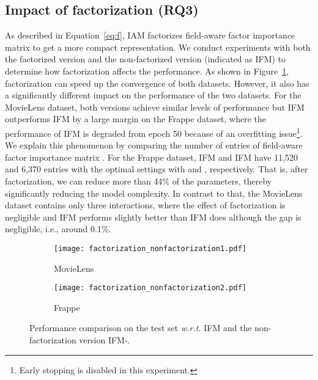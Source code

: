 \documentclass[letterpaper]{article} \usepackage{aaai19}  \usepackage{times}  \usepackage{helvet}  \usepackage{courier}  \usepackage{url}  \usepackage{graphicx}  \frenchspacing  \setlength{\pdfpagewidth}{8.5in}  \setlength{\pdfpageheight}{11in}  \usepackage{mathtools}
\begin{document}
\subsection{Impact of factorization (\textbf{RQ3})}
As described in Equation~\ref{eq:f}, IAM factorizes field-aware factor importance matrix  to get a more compact representation. We conduct experiments with both the factorized version and the non-factorized version (indicated as IFM)
to determine how factorization affects the performance. As shown in Figure~\ref{fig:factorization_nonfactorization}, factorization can speed up the convergence of both datasets. However, it also has a significantly different impact on the performance of the two datasets. For the MovieLens dataset, both versions achieve similar levels of performance but IFM outperforms IFM by a large margin on the Frappe dataset, where the performance of IFM is degraded from epoch 50 because of an overfitting issue\footnote{Early stopping is disabled in this experiment.}. We explain this phenomenon by comparing the number of entries of field-aware factor importance matrix . For the Frappe dataset, IFM and IFM have 11,520 and 6,370 entries with the optimal settings with  and , respectively. That is, after factorization, we can reduce more than 44\% of the parameters, thereby significantly reducing the model complexity. In contrast to that, the MovieLens dataset contains only three interactions, where the effect of factorization is negligible and IFM performs slightly better than IFM does although the gap is negligible, i.e., around 0.1\%.



\begin{figure}[t!]
\begin{center} 
\begin{subfigure}[MovieLens]{0.47\columnwidth}
{
\texttt{[image: factorization\_nonfactorization1.pdf]}
\caption{MovieLens}
} 
\end{subfigure}
\begin{subfigure}[Frappe]{0.47\columnwidth}
{
\texttt{[image: factorization\_nonfactorization2.pdf]}
\caption{Frappe}
} 
\end{subfigure}
\caption{ Performance comparison on the test set \emph{w.r.t.} IFM and the non-factorization version IFM-.}
\label{fig:factorization_nonfactorization} 
\end{center}
\end{figure} 
\end{document}
